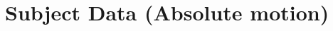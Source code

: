 \documentclass[11pt]{article} %
\begin{document}

\newpage
\section{Subject Data (Absolute motion)}
\end{document}
